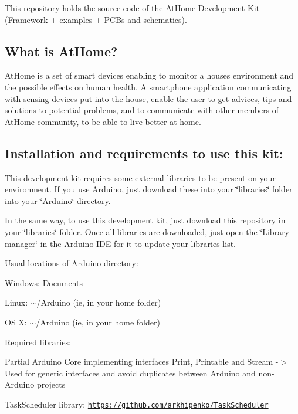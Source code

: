 This repository holds the source code of the At\+Home Development Kit (Framework + examples + P\+C\+Bs and schematics).

\subsection*{What is At\+Home?}

At\+Home is a set of smart devices enabling to monitor a house\textquotesingle{}s environment and the possible effects on human health. A smartphone application communicating with sensing devices put into the house, enable the user to get advices, tips and solutions to potential problems, and to communicate with other members of At\+Home community, to be able to live better at home.

\subsection*{Installation and requirements to use this kit\+:}

This development kit requires some external libraries to be present on your environment. If you use Arduino, just download these into your \char`\"{}libraries\char`\"{} folder into your \char`\"{}\+Arduino\char`\"{} directory.

In the same way, to use this development kit, just download this repository in your \char`\"{}libraries\char`\"{} folder. Once all libraries are downloaded, just open the \char`\"{}\+Library manager\char`\"{} in the Arduino I\+DE for it to update your libraries list.

Usual locations of Arduino directory\+:
\begin{DoxyItemize}
\item Windows\+: Documents
\item Linux\+: $\sim$/\+Arduino (ie, in your home folder)
\item OS X\+: $\sim$/\+Arduino (ie, in your home folder)
\end{DoxyItemize}

Required libraries\+:
\begin{DoxyItemize}
\item Partial Arduino Core implementing interfaces Print, Printable and Stream -\/$>$ Used for generic interfaces and avoid duplicates between Arduino and non-\/\+Arduino projects
\item Task\+Scheduler library\+: \href{https://github.com/arkhipenko/TaskScheduler}{\tt https\+://github.\+com/arkhipenko/\+Task\+Scheduler}
\end{DoxyItemize}

